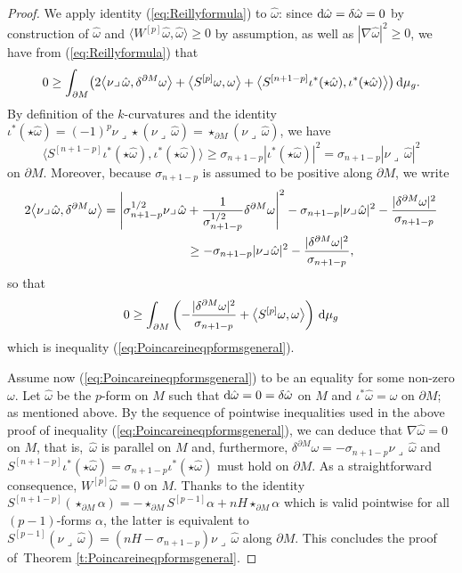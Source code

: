 \begin{proof}
We apply identity (\ref{eq:Reillyformula}) to $\hat{\omega}$: since ${\rm d}\hat{\omega}=\delta\hat{\omega}=0$ by construction of $\hat{\omega}$ and $\bigl\langle W^{[p]}\hat{\omega},\hat{\omega}\bigr\rangle\geq0$ by assumption,  as well as $|\nabla\hat{\omega}|^2\geq 0$, we have from (\ref{eq:Reillyformula}) that
\[0\geq\int_{\partial M}\bigl(2\bigl\langle\nu\lrcorner\,\hat{\omega},\delta^{\partial M}\omega\bigr\rangle+\bigl\langle S^{[p]}\omega,\omega\bigr\rangle+\bigl\langle S^{[n+1-p]}\iota^*(\star\hat{\omega}),\iota^*(\star\hat{\omega})\bigr\rangle\bigr)\,{\rm d}\mu_g.\]
By definition of the $k$-curvatures and the identity $\iota^*(\star\hat{\omega})=(-1)^p\nu\lrcorner\star(\nu\lrcorner\,\hat{\omega})=\star_{\partial M}(\nu\lrcorner\,\hat{\omega})$, we have
\begin{equation}\label{eq:sn1p}
\bigl\langle S^{[n+1-p]}\iota^*(\star\hat{\omega}),\iota^*(\star\hat{\omega})\bigr\rangle\geq\sigma_{n+1-p}|\iota^*(\star\hat{\omega})|^2=\sigma_{n+1-p}|\nu\lrcorner\,\hat{\omega}|^2
\end{equation}
on $\partial M$. Moreover, because $\sigma_{n+1-p}$ is assumed to be positive along $\partial M$,  we write
\begin{gather*}
2\bigl\langle\nu\lrcorner\,\hat{\omega},\delta^{\partial M}\omega\bigr\rangle=\Biggl|\sigma_{n+1-p}^{1/2}\nu\lrcorner\,\hat{\omega}+\frac{1}{\sigma_{n+1-p}^{1/2}}\delta^{\partial M}\omega\Biggr|^2-\sigma_{n+1-p}|\nu\lrcorner\,\hat{\omega}|^2-\frac{|\delta^{\partial M}\omega|^2}{\sigma_{n+1-p}}\\
\hphantom{2\bigl\langle\nu\lrcorner\,\hat{\omega},\delta^{\partial M}\omega\bigr\rangle}
\geq-\sigma_{n+1-p}|\nu\lrcorner\,\hat{\omega}|^2-\frac{|\delta^{\partial M}\omega|^2}{\sigma_{n+1-p}},
\end{gather*}
so that
\[0\geq \int_{\partial M}\left(-\frac{|\delta^{\partial M}\omega|^2}{\sigma_{n+1-p}}+\bigl\langle S^{[p]}\omega,\omega\bigr\rangle\right)\,{\rm d}\mu_g\]
which is inequality   (\ref{eq:Poincareineqpformsgeneral}).

Assume now (\ref{eq:Poincareineqpformsgeneral}) to be an equality for some non-zero $\omega$. Let $\hat{\omega}$ be the $p$-form on $M$ such that ${\rm d}\hat{\omega}=0=\delta\hat{\omega}$ on $M$ and $\iota^*\hat{\omega}=\omega$ on $\partial M$; as mentioned above.
By the sequence of pointwise i\-ne\-qua\-li\-ties used in the above proof of i\-ne\-qua\-li\-ty (\ref{eq:Poincareineqpformsgeneral}), we can deduce that $\nabla\hat{\omega}=0$ on $M$, that is,~$\hat{\omega}$ is parallel on $M$  and, furthermore, $\delta^{\partial M}\omega=-\sigma_{n+1-p}\nu\lrcorner\,\hat{\omega}$ and $S^{[n+1-p]}\iota^*(\star\hat{\omega})=\sigma_{n+1-p}\iota^*(\star\hat{\omega})$ must hold on $\partial M$.  As a straightforward consequence, $W^{[p]}\hat{\omega}=0$ on $M$. Thanks to the identity $S^{[n+1-p]}(\star_{\partial M}\alpha)=-\star_{\partial M}S^{[p-1]}\alpha+nH\star_{\partial M}\alpha$ which is valid pointwise for all $(p-1)$-forms $\alpha$, the latter is equivalent to $S^{[p-1]}(\nu\lrcorner\,\hat{\omega})=(nH-\sigma_{n+1-p})\nu\lrcorner\,\hat{\omega}$ along $\partial M$. This concludes the proof of~Theorem \ref{t:Poincareineqpformsgeneral}.
\end{proof}


